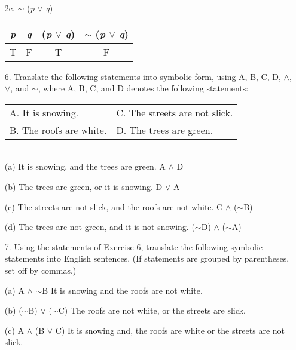 \documentclass{article}
\begin{document}
\begin{itemize}
    \item[2c.] $\sim$ (\emph{p} $\vee$ \emph{q})
    \begin{center}
        \begin{tabular}{|c|c|c|c|}
            \hline
            \emph{p} & \emph{q} & (\emph{p} $\vee$ \emph{q}) & $\sim$ (\emph{p} $\vee$ \emph{q})\\
            \hline
            T & F & T & F\\
            \hline
            
        \end{tabular}
    \end{center}
    
    \item[6.] Translate the following statements into symbolic form, using A, B, C, D, $\wedge$, $\vee$, and $\sim$, where A, B, C, and D denotes the following statements:\\
    \begin{table}[ht]
        \centering
        \begin{tabular}{ll}
             A. It is snowing. & C. The streets are not slick.\\
             B. The roofs are white. & D. The trees are green.
        \end{tabular}
    \end{table}\\
    (a) It is snowing, and the trees are green. {\color{blue} A $\wedge$ D}
    
    (b) The trees are green, or it is snowing. {\color{blue} D $\vee$ A}
    
    (c) The streets are not slick, and the roofs are not white. {\color{blue} C $\wedge$ ($\sim$B)}
    
    (d) The trees are not green, and it is not snowing. {\color{blue} ($\sim$D) $\wedge$ ($\sim$A)}
    
    \item[7.] Using the statements of Exercise 6, translate the following symbolic statements into English sentences. (If statements are grouped by parentheses, set off by commas.)
    
    (a) A $\wedge$ $\sim$B {\color{blue} It is snowing and the roofs are not white.}
    
    (b) ($\sim$B) $\vee$ ($\sim$C) {\color{blue} The roofs are not white, or the streets are slick.}
    
    (c) A $\wedge$ (B $\vee$ C) {\color{blue}It is snowing and, the roofs are white or the streets are not slick.}
    

\end{itemize}
\end{document}
